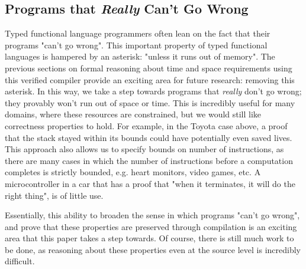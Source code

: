 \subsection{Programs that \emph{Really} Can't Go Wrong}

Typed functional language programmers often lean on the fact that their programs
"can't go wrong". This important property of typed functional languages is
hampered by an asterisk: "unless it runs out of memory".  The previous sections
on formal reasoning about time and space requirements using this verified
compiler provide an exciting area for future research: removing this asterisk.
In this way, we take a step towards programs that \emph{really} don't go wrong;
they provably won't run out of space or time. This is incredibly useful for many
domains, where these resources are constrained, but we would still like
correctness properties to hold. For example, in the Toyota case above, a proof
that the stack stayed within its bounds could have potentially even saved lives.
This approach also allows us to specify bounds on number of instructions, as
there are many cases in which the number of instructions before a computation
completes is strictly bounded, e.g. heart monitors, video games, etc. A
microcontroller in a car that has a proof that "when it terminates, it will do
the right thing", is of little use.  

Essentially, this ability to broaden the sense in which programs "can't go
wrong", and prove that these properties are preserved through compilation is an
exciting area that this paper takes a step towards. Of course, there is still
much work to be done, as reasoning about these properties even at the source
level is incredibly difficult.


